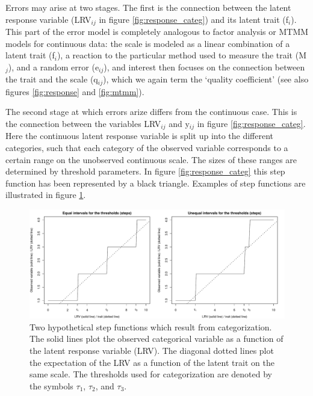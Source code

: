 \documentclass[a4paper,12pt]{article}
\begin{document}
Errors may arise at two stages. The first is the connection between the latent response variable (LRV$_{ij}$ in figure \ref{fig:response_categ}) and its latent trait (f$_i$). This part of the error model is completely analogous to factor analysis or MTMM models for continuous data: the scale is modeled as a linear combination of a latent trait (f$_i$), a reaction to the particular method used to measure the trait (M$_j$), and a random error (e$_{ij}$), and interest then focuses on the connection between the trait and the scale (q$_{ij}$), which we again term the `quality coefficient' (see also figures \ref{fig:response} and \ref{fig:mtmm}). 


The second stage at which errors arize differs from the continuous case. This is the connection between the variables LRV$_{ij}$ and y$_{ij}$ in figure \ref{fig:response_categ}. Here the continuous latent response variable is split up into the different categories, such that each category of the observed variable corresponds to a certain range on the unobserved continuous scale. The sizes of these ranges are determined by threshold parameters. In figure \ref{fig:response_categ} this step function has been represented by a black triangle. Examples of step functions are illustrated in figure \ref{fig:step-function}.

\begin{figure}[htb]\centering \includegraphics[width=\textwidth]{i/step-function} 
\caption{Two hypothetical step functions which result from categorization. The solid lines plot the observed categorical variable as a function of the latent response variable (LRV). The diagonal dotted lines plot the expectation of the LRV as a function of the latent trait on the same scale. The thresholds used for categorization are denoted by the symbols $\tau_1$, $\tau_2$, and $\tau_3$.\label{fig:step-function}} \end{figure}
\end{document}
